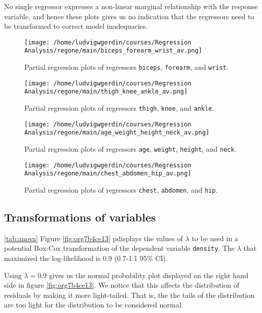 \documentclass[11pt]{article}
\begin{document}
No single regressor expresses a non-linear marginal relationship with the response variable, and hence
these plots gives us no indication that the regressors need to be transformed to correct model inadequacies.

\begin{figure}[htbp]
\centering
\texttt{[image: /home/ludvigwgerdin/courses/Regression Analysis/regone/main/biceps\_forearm\_wrist\_av.png]}
\caption{\label{fig:orgc2521a4}
Partial regression plots of regressors \texttt{biceps}, \texttt{forearm}, and \texttt{wrist}.}
\end{figure}   

\begin{figure}[htbp]
\centering
\texttt{[image: /home/ludvigwgerdin/courses/Regression Analysis/regone/main/thigh\_knee\_ankle\_av.png]}
\caption{\label{fig:orgfc828a1}
Partial regression plots of regressors \texttt{thigh}, \texttt{knee}, and \texttt{ankle}.}
\end{figure}

\begin{figure}[htbp]
\centering
\texttt{[image: /home/ludvigwgerdin/courses/Regression Analysis/regone/main/age\_weight\_height\_neck\_av.png]}
\caption{\label{fig:org1864d74}
Partial regression plots of regressors \texttt{age}, \texttt{weight}, \texttt{height}, and \texttt{neck}.}
\end{figure}

\begin{figure}[htbp]
\centering
\texttt{[image: /home/ludvigwgerdin/courses/Regression Analysis/regone/main/chest\_abdomen\_hip\_av.png]}
\caption{\label{fig:org164d6d3}
Partial regression plots of regressors \texttt{chest}, \texttt{abdomen}, and \texttt{hip}.}
\end{figure}
\subsection{Transformations of variables}
\label{sec:org0b58050}
\ref{tab:anova}
Figure \ref{fig:org7b4ce13} pdisplays the values of \(\lambda\) to be used in a potential Box-Cox transformation of 
the dependent variable \texttt{density}. The \(\lambda\) that maximized the log-likelihood is 0.9 (0.7-1.1 95\% CI). 

Using \(\lambda = 0.9\) gives us the normal probability plot displayed on the right hand side in figure \ref{fig:org7b4ce13}.
We notice that this affects the distribution of residuals by making it more light-tailed. That is, the 
the tails of the distribution are too light for the distribution to be considered normal.
\end{document}
